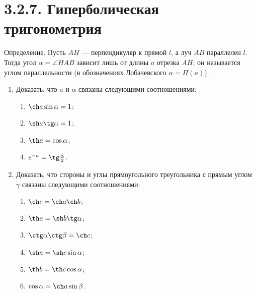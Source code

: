 	\section{3.2.7. Гиперболическая тригонометрия}

	Определение. Пусть $AH$ --- перпендикуляр к прямой $l$, а луч $AB$ параллелен $l$. Тогда угол $\alpha = \angle HAB$ зависит лишь от длины $a$ отрезка $AH$; он называется углом параллельности (в обозначениях Лобачевского $\alpha = \Pi(a)$).

	\begin{enumerate}[resume*]
		\item Доказать, что $a$ и $\alpha$ связаны следующими соотношениями:
		\begin{enumerate}
			\item $\ch a \sin \alpha = 1$;
			\item $\sh a \tg \alpha = 1$;
			\item $\th a = \cos \alpha$;
			\item $e^{-a} = \tg \frac{\alpha}{2}$.
		\end{enumerate}

		\item Доказать, что стороны и углы прямоугольного треугольника с прямым углом $\gamma$ связаны следующими соотношениями:
		\begin{enumerate}
			\item $\ch c = \ch a \ch b$;
			\item $\th a = \sh b \tg \alpha$;
			\item $\ctg \alpha \ctg \beta = \ch c$;
			\item $\sh a = \sh c \sin \alpha$;
			\item $\th b = \th c \cos \alpha$;
			\item $\cos \alpha = \ch a \sin \beta$.
		\end{enumerate}
	\end{enumerate}

